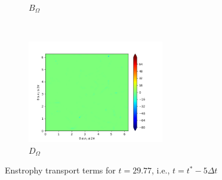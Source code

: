 \begin{figure}[H]
\begin{subfigure}{0.45\textwidth}
        \caption{$B_{\Omega}$}
    \end{subfigure}
    ~
    \begin{subfigure}{0.45\textwidth}
        \includegraphics[height=1.75in]{media/run-cds-65/D-enst-1335.png}
        \caption{$D_{\Omega}$}
    \end{subfigure}
    \caption{Enstrophy transport terms for $t=29.77$, i.e., $t=t^{\ast} -5 \Delta t$}
\end{figure}

\newpage

